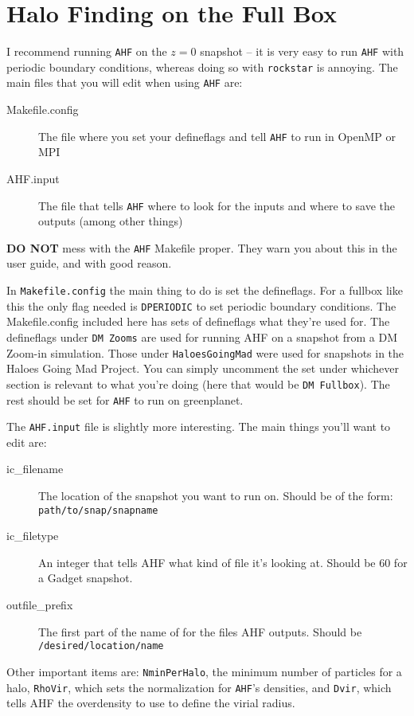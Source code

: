 \documentclass[10pt,a4paper,onecolumn]{article}
\begin{document}
\section{Halo Finding on the Full Box}
I recommend running \texttt{AHF} on the $z = 0$ snapshot -- it is very easy to run 
\texttt{AHF} with periodic boundary conditions, whereas doing so with 
\texttt{rockstar} is annoying.  The main files that you will edit when using \texttt{AHF} are:

\begin{description}
\item[Makefile.config] The file where you set your defineflags and tell \texttt{AHF} to run in OpenMP or MPI
\item[AHF.input] The file that tells \texttt{AHF} where to look for the inputs and where to save the outputs (among other things)
\end{description}

\textbf{DO NOT} mess with the \texttt{AHF} Makefile proper.  They warn you about this in the user guide, and with good reason.

In \texttt{Makefile.config} the main thing to do is set the defineflags.  For a fullbox like this the only flag needed is \texttt{DPERIODIC} to set periodic boundary conditions.  The Makefile.config included here has sets of defineflags  what they're used for.  The defineflags under \texttt{DM Zooms} are used for running AHF on a snapshot from a DM Zoom-in simulation.  Those under \texttt{HaloesGoingMad} were used for snapshots in the Haloes Going Mad Project.  You can simply uncomment the set under whichever section is relevant to what you're doing (here that would be \texttt{DM Fullbox}).  The rest should be set for \texttt{AHF} to run on greenplanet.

The \texttt{AHF.input} file is slightly more interesting.  The main things you'll want to edit are:
\begin{description}
\item[ic\_filename] The location of the snapshot you want to run on.  Should be of the form: \texttt{path/to/snap/snapname}
\item[ic\_filetype] An integer that tells AHF what kind of file it's looking at.  Should be 60 for a Gadget snapshot.
\item[outfile\_prefix] The first part of the name of for the files AHF outputs.  Should be \texttt{/desired/location/name}
\end{description}
Other important items are: \texttt{NminPerHalo}, the minimum number of particles for a halo, \texttt{RhoVir}, which sets the normalization for \texttt{AHF}'s densities, and \texttt{Dvir}, which tells AHF the overdensity to use to define the virial radius.  
\end{document}
